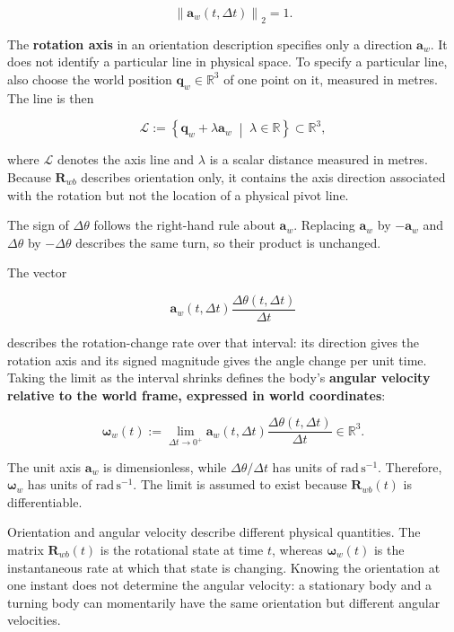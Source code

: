 \documentclass[
  australian,
  12pt,
  letterpaper,
  DIV=11,
  numbers=noendperiod,
  twoside]{scrreprt}
\begin{document}
\[
\left\|\mathbf a_w(t,\Delta t)\right\|_2=1.
\]

The \textbf{rotation axis} in an orientation description specifies only
a direction \(\mathbf a_w\). It does not identify a particular line in
physical space. To specify a particular line, also choose the world
position \(\mathbf q_w\in\mathbb R^3\) of one point on it, measured in
metres. The line is then

\[
\mathcal L
\mathrel{:=}
\left\{
\mathbf q_w+\lambda\mathbf a_w
\;\middle|\;
\lambda\in\mathbb R
\right\}
\subset\mathbb R^3,
\]

where \(\mathcal L\) denotes the axis line and \(\lambda\) is a scalar
distance measured in metres. Because \(\mathbf R_{wb}\) describes
orientation only, it contains the axis direction associated with the
rotation but not the location of a physical pivot line.

The sign of \(\Delta\theta\) follows the right-hand rule about
\(\mathbf a_w\). Replacing \(\mathbf a_w\) by \(-\mathbf a_w\) and
\(\Delta\theta\) by \(-\Delta\theta\) describes the same turn, so their
product is unchanged.

The vector

\[
\mathbf a_w(t,\Delta t)
\frac{\Delta\theta(t,\Delta t)}{\Delta t}
\]

describes the rotation-change rate over that interval: its direction
gives the rotation axis and its signed magnitude gives the angle change
per unit time. Taking the limit as the interval shrinks defines the
body's \textbf{angular velocity relative to the world frame, expressed
in world coordinates}:

\[
\boxed{
\boldsymbol\omega_w(t)
\mathrel{:=}
\lim_{\Delta t\to0^+}
\mathbf a_w(t,\Delta t)
\frac{\Delta\theta(t,\Delta t)}{\Delta t}
\in\mathbb R^3
}.
\]

The unit axis \(\mathbf a_w\) is dimensionless, while
\(\Delta\theta/\Delta t\) has units of \(\mathrm{rad\,s^{-1}}\).
Therefore, \(\boldsymbol\omega_w\) has units of
\(\mathrm{rad\,s^{-1}}\). The limit is assumed to exist because
\(\mathbf R_{wb}(t)\) is differentiable.

Orientation and angular velocity describe different physical quantities.
The matrix \(\mathbf R_{wb}(t)\) is the rotational state at time \(t\),
whereas \(\boldsymbol\omega_w(t)\) is the instantaneous rate at which
that state is changing. Knowing the orientation at one instant does not
determine the angular velocity: a stationary body and a turning body can
momentarily have the same orientation but different angular velocities.
\end{document}
